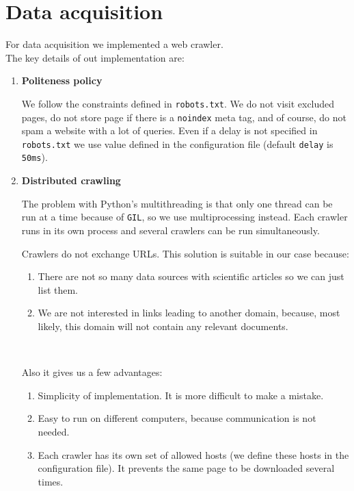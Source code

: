 \section{Data acquisition}
For data acquisition we implemented a web crawler. \\
The key details of out implementation are:
\begin{enumerate}
    \item
        \textbf{Politeness policy}
        
        We follow the constraints defined in \texttt{robots.txt}.
        We do not visit excluded pages, do not store page if there is a \texttt{noindex} meta tag, and of course, do not spam a website with a lot of queries.
        Even if a delay is not specified in \texttt{robots.txt} we use value defined in the configuration file (default \texttt{delay} is \texttt{50ms}).

    \item
        \textbf{Distributed crawling}
        
        The problem with Python's multithreading is that only one thread can be run at a time because of \texttt{GIL}, so we use multiprocessing instead.
        Each crawler runs in its own process and several crawlers can be run simultaneously.

		\pagebreak
		Crawlers do not exchange URLs. This solution is suitable in our case because:
		\begin{enumerate}
            \item
                There are not so many data sources with scientific articles so we can just list them.
            \item
            	We are not interested in links leading to another domain, because, most likely, this domain will not contain any relevant documents.
        \end{enumerate}
		\

		Also it gives us a few advantages:
		\begin{enumerate}
			\item Simplicity of implementation. It is more difficult to make a mistake.
			\item Easy to run on different computers, because communication is not needed.
			\item Each crawler has its own set of allowed hosts (we define these hosts in the configuration file). It prevents the same page to be downloaded several times.
		\end{enumerate}

\end{enumerate}

